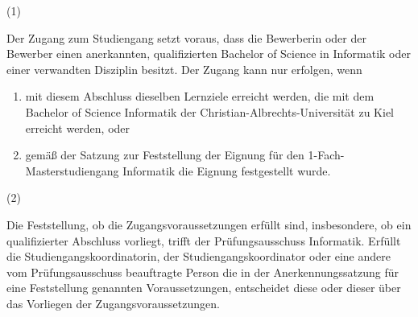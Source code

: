 \documentclass{article}\usepackage{helvet}\renewcommand{\familydefault}{\sfdefault}\usepackage[letterpaper,top=2cm,bottom=2cm,left=3cm,right=3cm,marginparwidth=1.75cm]{geometry}\usepackage[colorlinks=true,allcolors=red]{hyperref}\usepackage{enumitem}\usepackage{tabularx}\usepackage[T1]{fontenc}\setlist[enumerate,1]{label=\arabic*., left=0pt}\setlist[enumerate,2]{label=\alph*., left=0.5em}\setlist[enumerate,3]{label=\alph*\alph*., left=1em}\setlist[enumerate,4]{label=-, left=1.5em}\setlist{nosep}\setlength{\parindent}{0pt}
\begin{document}
	\begin{minipage}[t]
		{2em}
		(1)
	\end{minipage}
\hspace{0.5em}
	\begin{minipage}[t]
		{\dimexpr\linewidth-2em-0.5em\relax}
		Der Zugang zum Studiengang setzt voraus, dass die Bewerberin oder der Bewerber einen anerkannten, qualifizierten Bachelor of Science in Informatik oder einer verwandten Disziplin besitzt. Der Zugang kann nur erfolgen, wenn
		\begin{enumerate}
			\item{mit diesem Abschluss dieselben Lernziele erreicht werden, die mit dem Bachelor of Science Informatik der Christian-Albrechts-Universität zu Kiel erreicht werden, oder}
			\item{gemäß der Satzung zur Feststellung der Eignung für den 1-Fach-Masterstudiengang Informatik die Eignung festgestellt wurde.}
		\end{enumerate}

	\end{minipage}

\medski

	\begin{minipage}[t]
		{2em}
		(2)
	\end{minipage}
\hspace{0.5em}
	\begin{minipage}[t]
		{\dimexpr\linewidth-2em-0.5em\relax}
		Die Feststellung, ob die Zugangsvoraussetzungen erfüllt sind, insbesondere, ob ein qualifizierter Abschluss vorliegt, trifft der Prüfungsausschuss Informatik. Erfüllt die Studiengangskoordinatorin, der Studiengangskoordinator oder eine andere vom Prüfungsausschuss beauftragte Person die in der Anerkennungssatzung für eine Feststellung genannten Voraussetzungen, entscheidet diese oder dieser über das Vorliegen der Zugangsvoraussetzungen.
	\end{minipage}

\medski
\end{document}
